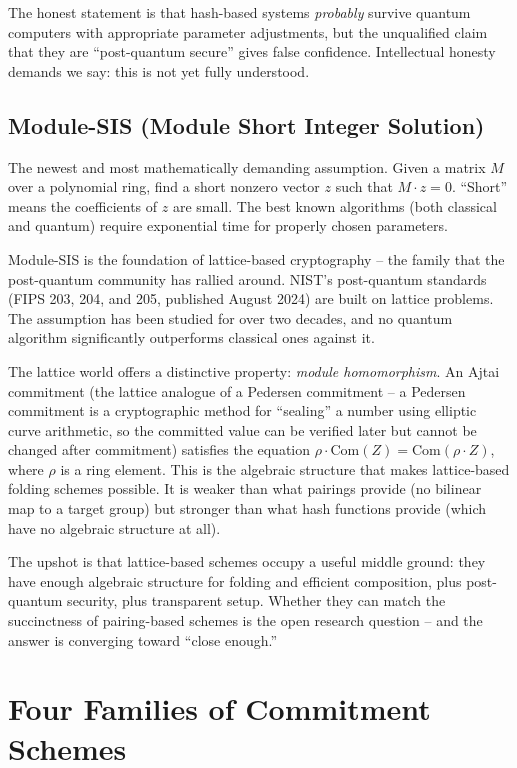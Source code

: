 \documentclass[
  11pt,
  openany]{report}
\begin{document}
The honest statement is that hash-based systems \emph{probably} survive quantum
computers with appropriate parameter adjustments, but the unqualified claim that
they are ``post-quantum secure'' gives false confidence. Intellectual honesty
demands we say: this is not yet fully understood.

\subsection{Module-SIS (Module Short Integer
Solution)}\label{module-sis-module-short-integer-solution}

The newest and most mathematically demanding assumption. Given a matrix \(M\)
over a polynomial ring, find a short nonzero vector \(z\) such that
\(M \cdot z = 0\). ``Short'' means the coefficients of \(z\) are small. The best
known algorithms (both classical and quantum) require exponential time for
properly chosen parameters.

Module-SIS is the foundation of lattice-based cryptography -- the family that
the post-quantum community has rallied around. NIST's post-quantum standards
(FIPS 203, 204, and 205, published August 2024) are built on lattice problems.
The assumption has been studied for over two decades, and no quantum algorithm
significantly outperforms classical ones against it.

The lattice world offers a distinctive property: \emph{module homomorphism}. An
Ajtai commitment (the lattice analogue of a Pedersen commitment -- a Pedersen
commitment is a cryptographic method for ``sealing'' a number using elliptic
curve arithmetic, so the committed value can be verified later but cannot be
changed after commitment) satisfies the equation
\(\rho \cdot \text{Com}(Z) = \text{Com}(\rho \cdot Z)\), where \(\rho\) is a
ring element. This is the algebraic structure that makes lattice-based folding
schemes possible. It is weaker than what pairings provide (no bilinear map to a
target group) but stronger than what hash functions provide (which have no
algebraic structure at all).

The upshot is that lattice-based schemes occupy a useful middle ground: they
have enough algebraic structure for folding and efficient composition, plus
post-quantum security, plus transparent setup. Whether they can match the
succinctness of pairing-based schemes is the open research question -- and the
answer is converging toward ``close enough.''

\section{Four Families of Commitment
Schemes}\label{four-families-of-commitment-schemes}
\end{document}
